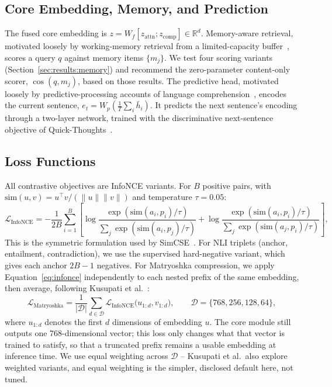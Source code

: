 \documentclass[manuscript]{acmart}
\begin{document}
\subsection{Core Embedding, Memory, and Prediction}

The fused core embedding is $z = W_f[z_{\text{attn}}; z_{\text{comp}}] \in \mathbb{R}^d$. Memory-aware retrieval, motivated loosely by working-memory retrieval from a limited-capacity buffer~\citep{baddeley2000episodic}, scores a query $q$ against memory items $\{m_j\}$. We test four scoring variants (Section~\ref{sec:results:memory}) and recommend the zero-parameter content-only scorer, $\cos(q,m_j)$, based on those results. The predictive head, motivated loosely by predictive-processing accounts of language comprehension~\citep{clark2013whatever}, encodes the current sentence, $e_t = W_p(\tfrac{1}{T}\sum_i \bar h_i)$. It predicts the next sentence's encoding through a two-layer network, trained with the discriminative next-sentence objective of Quick-Thoughts~\citep{logeswaran2018quickthoughts}.

\subsection{Loss Functions}

All contrastive objectives are InfoNCE variants. For $B$ positive pairs, with $\text{sim}(u,v)=u^\top v/(\lVert u\rVert\lVert v\rVert)$ and temperature $\tau=0.05$:
\begin{equation}
\mathcal{L}_{\text{InfoNCE}} = -\frac{1}{2B}\sum_{i=1}^{B}\left[\log\frac{\exp(\text{sim}(a_i,p_i)/\tau)}{\sum_j\exp(\text{sim}(a_i,p_j)/\tau)} + \log\frac{\exp(\text{sim}(a_i,p_i)/\tau)}{\sum_j\exp(\text{sim}(a_j,p_i)/\tau)}\right],
\label{eq:infonce}
\end{equation}
This is the symmetric formulation used by SimCSE~\citep{gao2021simcse}. For NLI triplets (anchor, entailment, contradiction), we use the supervised hard-negative variant, which gives each anchor $2B-1$ negatives. For Matryoshka compression, we apply Equation~\ref{eq:infonce} independently to each nested prefix of the same embedding, then average, following Kusupati et al.~\citep{kusupati2022mrl}:
\begin{equation}
\mathcal{L}_{\text{Matryoshka}} = \frac{1}{|\mathcal{D}|}\sum_{d\in\mathcal{D}} \mathcal{L}_{\text{InfoNCE}}\big(u_{1:d}, v_{1:d}\big), \qquad \mathcal{D}=\{768,256,128,64\},
\label{eq:matryoshka}
\end{equation}
where $u_{1:d}$ denotes the first $d$ dimensions of embedding $u$. The core module still outputs one 768-dimensional vector; this loss only changes what that vector is trained to satisfy, so that a truncated prefix remains a usable embedding at inference time. We use equal weighting across $\mathcal{D}$ -- Kusupati et al.\ also explore weighted variants, and equal weighting is the simpler, disclosed default here, not tuned.
\end{document}
